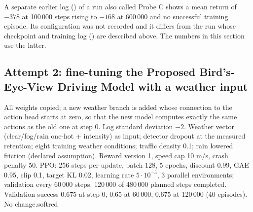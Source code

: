 \begin{cautionbox}
A separate earlier log () of a run also called Probe C shows a mean return of $-378$ at 100\,000 steps rising to $-168$ at 600\,000 and no successful training episode. Its configuration was not recorded and it differs from the run whose checkpoint and training log () are described above. The numbers in this section use the latter.
\end{cautionbox}

\subsection{Attempt 2: fine-tuning the Proposed Bird's-Eye-View Driving Model with a weather input}
{All weights copied; a new weather branch is added whose connection to the action head starts at zero, so that the new model computes exactly the same actions as the old one at step 0. Log standard deviation $-2$.}
{Weather vector (clear/fog/rain one-hot + intensity) as input; detector dropout at the measured retention; eight training weather conditions; traffic density 0.1; rain lowered friction (declared assumption). Reward version 1, speed cap 10 m/s, crash penalty 50.}
{PPO: 256 steps per update, batch 128, 5 epochs, discount 0.99, GAE 0.95, clip 0.1, target KL 0.02, learning rate $5\cdot10^{-5}$, 3 parallel environments; validation every 60\,000 steps. 120\,000 of 480\,000 planned steps completed.}
{Validation success 0.675 at step 0, 0.65 at 60\,000, 0.675 at 120\,000 (40 episodes). No change.}{softred}

